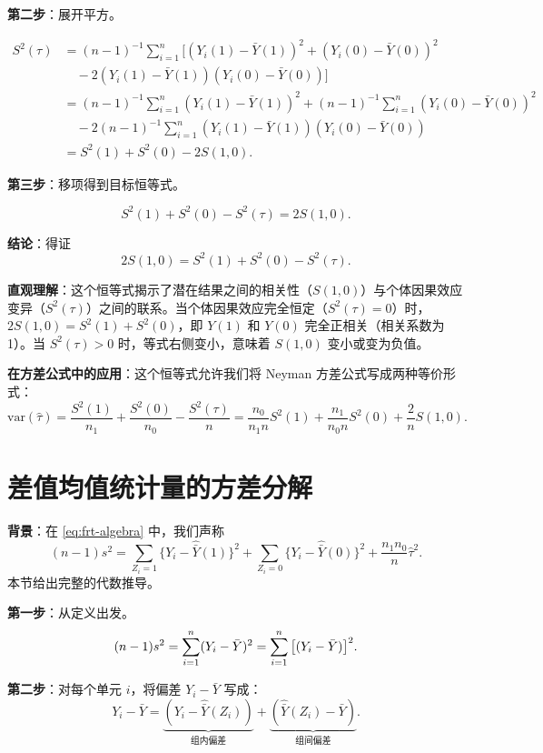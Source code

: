 \textbf{第二步}：展开平方。

\[
\begin{aligned}
S^2(\tau) &= (n-1)^{-1}\sum_{i=1}^n \Big[ (Y_i(1) - \bar{Y}(1))^2 + (Y_i(0) - \bar{Y}(0))^2 \\
&\quad - 2(Y_i(1) - \bar{Y}(1))(Y_i(0) - \bar{Y}(0)) \Big] \\
&= (n-1)^{-1}\sum_{i=1}^n (Y_i(1) - \bar{Y}(1))^2 + (n-1)^{-1}\sum_{i=1}^n (Y_i(0) - \bar{Y}(0))^2 \\
&\quad - 2(n-1)^{-1}\sum_{i=1}^n (Y_i(1) - \bar{Y}(1))(Y_i(0) - \bar{Y}(0)) \\
&= S^2(1) + S^2(0) - 2S(1,0).
\end{aligned}
\]

\textbf{第三步}：移项得到目标恒等式。

\[
S^2(1) + S^2(0) - S^2(\tau) = 2S(1,0).
\]

\textbf{结论}：得证
\[
\boxed{2S(1,0) = S^2(1) + S^2(0) - S^2(\tau)}.
\]

\textbf{直观理解}：这个恒等式揭示了潜在结果之间的相关性（$S(1,0)$）与个体因果效应变异（$S^2(\tau)$）之间的联系。当个体因果效应完全恒定（$S^2(\tau) = 0$）时，$2S(1,0) = S^2(1) + S^2(0)$，即 $Y(1)$ 和 $Y(0)$ 完全正相关（相关系数为 1）。当 $S^2(\tau) > 0$ 时，等式右侧变小，意味着 $S(1,0)$ 变小或变为负值。

\textbf{在方差公式中的应用}：这个恒等式允许我们将 Neyman 方差公式写成两种等价形式：
\[
\text{var}(\hat{\tau}) = \frac{S^2(1)}{n_1} + \frac{S^2(0)}{n_0} - \frac{S^2(\tau)}{n} = \frac{n_0}{n_1 n}S^2(1) + \frac{n_1}{n_0 n}S^2(0) + \frac{2}{n}S(1,0).
\]

\section{差值均值统计量的方差分解}\label{sec:frt-algebra-derivation}

\textbf{背景}：在 \cref{eq:frt-algebra} 中，我们声称
\[
(n-1)s^2 = \sum_{Z_i=1} \{Y_i - \hat{\bar{Y}}(1)\}^2 + \sum_{Z_i=0} \{Y_i - \hat{\bar{Y}}(0)\}^2 + \frac{n_1 n_0}{n} \hat{\tau}^2 .
\label{eq:frt-variance-decomposition}
\]
本节给出完整的代数推导。

\textbf{第一步}：从定义出发。
\[
(n-1)s^2 = \sum_{i=1}^n (Y_i - \bar{Y})^2 = \sum_{i=1}^n \big[ (Y_i - \bar{Y}) \big]^2 .
\]

\textbf{第二步}：对每个单元 $i$，将偏差 $Y_i - \bar{Y}$ 写成：
\[
Y_i - \bar{Y} = \underbrace{(Y_i - \hat{\bar{Y}}(Z_i))}_{\text{组内偏差}} + \underbrace{(\hat{\bar{Y}}(Z_i) - \bar{Y})}_{\text{组间偏差}} .
\]

